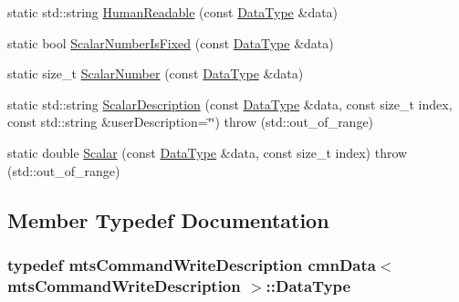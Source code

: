 \begin{DoxyCompactItemize}
\item 
static std\+::string \hyperlink{classcmn_data_3_01mts_command_write_description_01_4_a7e9f00c746314d13dce2ae0128e1d58f}{Human\+Readable} (const \hyperlink{classcmn_data_3_01mts_command_write_description_01_4_aed29f1a95e5884bf865916b40933e824}{Data\+Type} \&data)
\item 
static bool \hyperlink{classcmn_data_3_01mts_command_write_description_01_4_a3b6800d2d272de63979b70feb4bdf78d}{Scalar\+Number\+Is\+Fixed} (const \hyperlink{classcmn_data_3_01mts_command_write_description_01_4_aed29f1a95e5884bf865916b40933e824}{Data\+Type} \&data)
\item 
static size\+\_\+t \hyperlink{classcmn_data_3_01mts_command_write_description_01_4_a3be9ee1c9e548f685258fad97fa8f5db}{Scalar\+Number} (const \hyperlink{classcmn_data_3_01mts_command_write_description_01_4_aed29f1a95e5884bf865916b40933e824}{Data\+Type} \&data)
\item 
static std\+::string \hyperlink{classcmn_data_3_01mts_command_write_description_01_4_ae6292faf353c668a51ce0b274bef29bc}{Scalar\+Description} (const \hyperlink{classcmn_data_3_01mts_command_write_description_01_4_aed29f1a95e5884bf865916b40933e824}{Data\+Type} \&data, const size\+\_\+t index, const std\+::string \&user\+Description=\char`\"{}\char`\"{})  throw (std\+::out\+\_\+of\+\_\+range)
\item 
static double \hyperlink{classcmn_data_3_01mts_command_write_description_01_4_a273a03350154294f65d6f0f503324076}{Scalar} (const \hyperlink{classcmn_data_3_01mts_command_write_description_01_4_aed29f1a95e5884bf865916b40933e824}{Data\+Type} \&data, const size\+\_\+t index)  throw (std\+::out\+\_\+of\+\_\+range)
\end{DoxyCompactItemize}


\subsection{Member Typedef Documentation}
\hypertarget{classcmn_data_3_01mts_command_write_description_01_4_aed29f1a95e5884bf865916b40933e824}{}
\subsubsection[{Data\+Type}]{\setlength{\rightskip}{0pt plus 5cm}typedef {\bf mts\+Command\+Write\+Description} {\bf cmn\+Data}$<$ {\bf mts\+Command\+Write\+Description} $>$\+::{\bf Data\+Type}}\label{classcmn_data_3_01mts_command_write_description_01_4_aed29f1a95e5884bf865916b40933e824}



